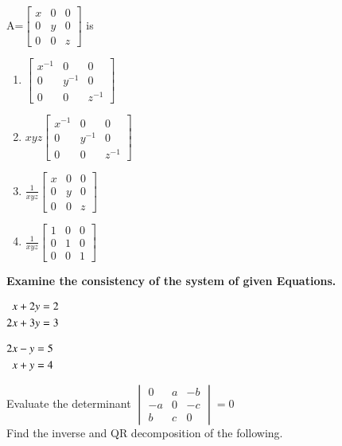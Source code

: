 A=$\begin{bmatrix}
x&0&0 \\ 0&y&0 \\ 0&0&z
\end{bmatrix}$ is 
\begin{enumerate}
\item $\begin{bmatrix} x^{-1}&0&0 \\ 0&y^{-1}&0 \\ 0&0&z^{-1} \end{bmatrix}$ 
\item $xyz\begin{bmatrix} x^{-1}&0&0 \\ 0&y^{-1}&0 \\ 0&0&z^{-1} \end{bmatrix}$ 
\item $\frac{1}{xyz}\begin{bmatrix} x&0&0 \\ 0&y&0 \\ 0&0&z \end{bmatrix}$ 
\item $\frac{1}{xyz}\begin{bmatrix} 1&0&0 \\ 0&1&0 \\ 0&0&1 \end{bmatrix}$ 
\end{enumerate}
\textbf{Examine the consistency of the system of given Equations.}
\item 
$\begin{alignedat}[t]{2}
x+2y&=2 
\\
2x+3y&=3 
\end{alignedat}$
\item $\begin{alignedat}[t]{2}
2x-y&=5 
\\
x+y&=4 
\end{alignedat}$
\item Evaluate the determinant
$\begin{vmatrix}0&a&-b\\-a&0&-c\\b&c&0\end{vmatrix}=0$
\\
Find the inverse and QR decomposition of the following.
  \item {}\\
  \item{}\\
